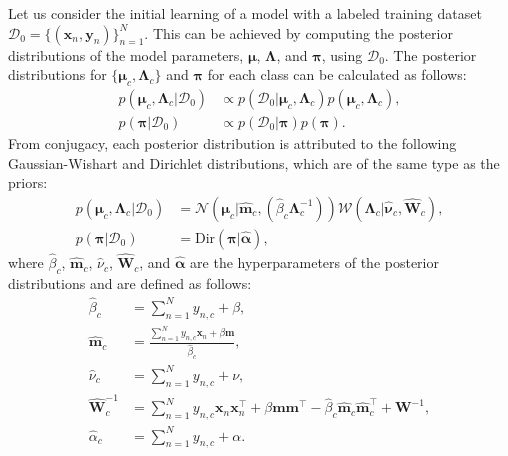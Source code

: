 \documentclass[letterpaper, 10 pt, conference]{ieeeconf}
\begin{document}
Let us consider the initial learning of a model with a labeled training dataset $\mathcal{D}_0 = \{(\mathbf{x}_n, \mathbf{y}_n)\}^{N}_{n=1}$. 
This can be achieved by computing the posterior distributions of the model parameters, $\boldsymbol{\mu}$, $\mathbf{\Lambda}$, and $\boldsymbol{\pi}$, using $\mathcal{D}_0$. 
The posterior distributions for $\{\boldsymbol{\mu}_{c}, \boldsymbol{\Lambda}_{c}\}$ and $\boldsymbol{\pi}$ for each class can be calculated as follows:
\begin{align}
    p(\boldsymbol{\mu}_{c},\mathbf{\Lambda}_{c}|\mathcal{D}_0) &\propto p(\mathcal{D}_0 | \boldsymbol{\mu}_c, \boldsymbol{\Lambda}_c ) p (\boldsymbol{\mu}_c, \boldsymbol{\Lambda}_c),\\
        p(\boldsymbol{\pi}|\mathcal{D}_0) &\propto p( \mathcal{D}_0 | \boldsymbol{\pi}) p (\boldsymbol{\pi}).
\end{align}
From conjugacy, each posterior distribution is attributed to the following Gaussian-Wishart and Dirichlet distributions, which are of the same type as the priors:
\begin{align}
    p(\boldsymbol{\mu}_{c},\mathbf{\Lambda}_{c}|\mathcal{D}_{0})&=\mathcal{N}(\boldsymbol{\mu}_{c}|\hat{\mathbf{m}}_{c},(\hat{\beta}_{c}\mathbf{\Lambda}^{-1}_{c}))\mathcal{W}(\mathbf{\Lambda}_{c}|\hat{\mathbf{\nu}}_{c},\hat{\mathbf{W}}_{c}),\\    
    p(\boldsymbol{\pi}|\mathcal{D}_{0})&=\text{Dir}(\mathbf{\pi}|\hat{\boldsymbol{\alpha}}),
\end{align}
where $\hat{\beta}_c$, $\hat{\mathbf{m}}_c$, $\hat{\nu}_c$, $\hat{\mathbf{W}}_c$, and $\hat{\boldsymbol{\alpha}}$ are the hyperparameters of the posterior distributions and are defined as follows:
\begin{align}
    \hat{\beta}_{c}&=\sum_{n=1}^{N}y_{n,c}+\beta\label{fl-beta},\\ 
    \hat{\mathbf{m}}_{c}&=\frac{\sum_{n=1}^{N}y_{n,c}\mathbf{x}_{n}+\beta\mathbf{m}}{\hat{\beta}_{c}},\\
    \hat{\nu}_{c}&=\sum_{n=1}^{N}y_{n,c}+\nu,  \\    
    \hat{\mathbf{W}}_{c}^{-1}&=\sum_{n=1}^{N}y_{n,c}\mathbf{x}_{n}\mathbf{x}_{n}^{\top}+\beta \mathbf{m}\mathbf{m}^{\top}-\hat{\beta}_{c}\hat{\mathbf{m}}_{c}\hat{\mathbf{m}}_{c}^{\top}+\mathbf{W}^{-1},   \\
    \hat{\alpha}_{c}&=\sum_{n=1}^{N}y_{n,c}+\alpha. \label{fl-alpha}
\end{align}
\end{document}
